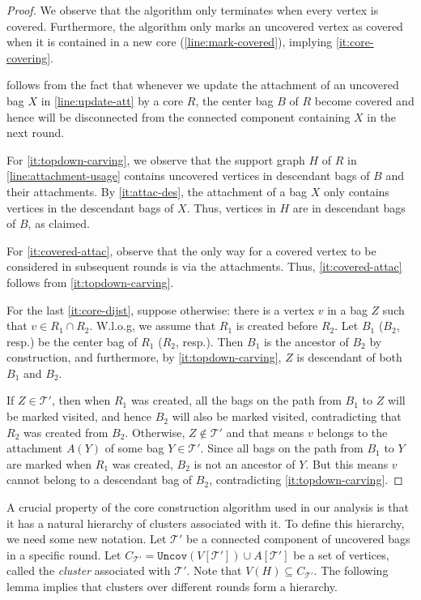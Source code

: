 \documentclass{article}
\newcommand{\mt}{\mathcal{T}}
\def\uncovset{\mathtt{Uncov}}
\def\core{R}
\begin{document}
\begin{proof}
	
	We observe that the algorithm only terminates when every vertex is covered. Furthermore, the algorithm only marks an uncovered vertex as covered when it is contained in a new core (\cref{line:mark-covered}), implying \cref{it:core-covering}. 
	
	 follows from the fact that whenever we update the attachment of an uncovered bag $X$ in \cref{line:update-att} by a core $R$, the center bag $B$ of $R$ become covered and hence will be disconnected from the connected component containing $X$ in the next round. 
	
	For \cref{it:topdown-carving}, we observe that the support graph $H$ of $R$ in \cref{line:attachment-usage} contains uncovered vertices in descendant bags of $B$ and their attachments. By \cref{it:attac-des}, the attachment of a bag $X$ only contains vertices in the descendant bags of $X$. Thus, vertices in $H$ are in descendant bags of $B$, as claimed.
	
	For \cref{it:covered-attac}, observe that the only way for a covered vertex to be considered in subsequent rounds is via the attachments. Thus, \cref{it:covered-attac} follows from \cref{it:topdown-carving}. 
	
	For the last \cref{it:core-dijst}, suppose otherwise: there is a vertex $v$ in a bag $Z$ such that $v\in \core_1\cap\core_2$. W.l.o.g, we assume that $\core_1$ is created before $\core_2$. Let $B_1$ ($B_2$, resp.) be the center bag of $\core_1$ ($\core_2$, resp.). Then $B_1$ is the ancestor of $B_2$ by construction, and furthermore, by \cref{it:topdown-carving},  $Z$ is descendant of both $B_1$ and $B_2$. 
	
	If $Z \in \mt'$, then when $\core_1$ was created, all the bags on the path from $B_1$ to $Z$ will be marked visited, and hence $B_2$ will also be marked visited, contradicting that $\core_2$ was created from $B_2$. Otherwise, $Z \not \in \mt'$ and that means $v$ belongs to the attachment $A(Y)$ of some bag $Y\in \mt'$. Since all bags on the path from $B_1$ to $Y$ are marked when $\core_1$ was created, $B_2$ is not an ancestor of $Y$. But this means $v$ cannot belong to a descendant bag of $B_2$, contradicting \cref{it:topdown-carving}. 
\end{proof}

A crucial property of the core construction algorithm used in our analysis is that it has a natural hierarchy of clusters associated with it. To define this hierarchy, we need some new notation.  Let $\mt'$ be a connected component of uncovered bags in a specific round. Let $C_{\mt'} = \uncovset(V[\mt']) \cup A[\mt']$ be a set of vertices, called the \emph{cluster} associated with $\mt'$. Note that $V(H)\subseteq C_{\mt'}$. The following lemma implies that clusters over different rounds form a hierarchy.
\end{document}
